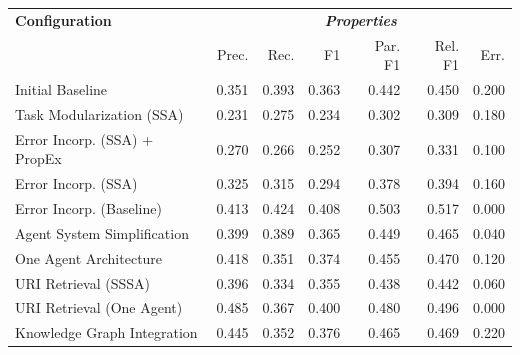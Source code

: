 \documentclass[a4paper,oneside,bibliography=totoc]{scrbook}
\begin{document}
\begin{table}[h]
  \centering
  \begin{tabular}{p{4cm}|rrrrrr}
    \toprule
    \textbf{Configuration}               & \multicolumn{6}{c}{\textit{\textbf{Properties}}}                                                                                      \\
                                         & Prec.                                            & Rec.           & F1             & Par. F1        & Rel. F1        & Err.           \\
    \midrule
    Initial Baseline                     & 0.351                                            & 0.393          & 0.363          & 0.442          & 0.450          & 0.200          \\
    Task Modularization (SSA)            & 0.231                                            & 0.275          & 0.234          & 0.302          & 0.309          & 0.180          \\
    Error Incorp. (SSA) + PropEx         & 0.270                                            & 0.266          & 0.252          & 0.307          & 0.331          & 0.100          \\
    Error Incorp. (SSA)                  & 0.325                                            & 0.315          & 0.294          & 0.378          & 0.394          & 0.160          \\
    Error Incorp. (Baseline)             & 0.413                                            & 0.424          & 0.408          & 0.503          & 0.517          & 0.000          \\
    Agent System Simplification          & 0.399                                            & 0.389          & 0.365          & 0.449          & 0.465          & 0.040          \\
    One Agent Architecture               & 0.418                                            & 0.351          & 0.374          & 0.455          & 0.470          & 0.120          \\
    URI Retrieval (SSSA)                 & 0.396                                            & 0.334          & 0.355          & 0.438          & 0.442          & 0.060          \\
    URI Retrieval (One Agent)            & 0.485                                            & 0.367          & 0.400          & 0.480          & 0.496          & 0.000          \\
    Knowledge Graph Integration          & 0.445                                            & 0.352          & 0.376          & 0.465          & 0.469          & 0.220          \\

\end{tabular}
\end{table}
\end{document}
